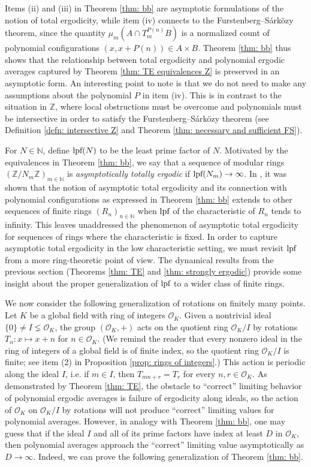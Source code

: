\documentclass{amsart}
\theoremstyle{definition}
\numberwithin{equation}{section}
\newcommand{\N}{\mathbb{N}}
\newcommand{\Z}{\mathbb{Z}}
\newcommand{\mO}{\mathcal{O}}
\newcommand{\lpf}{\normalfont\text{lpf}}
\begin{document}
Items (ii) and (iii) in Theorem \ref{thm: bb} are asymptotic formulations of the notion of total ergodicity, while item (iv) connects to the Furstenberg--S\'{a}rk\"{o}zy theorem, since the quantity $\mu_m(A \cap T_m^{P(n)}B)$ is a normalized count of polynomial configurations $(x, x+P(n)) \in A \times B$.
Theorem \ref{thm: bb} thus shows that the relationship between total ergodicity and polynomial ergodic averages captured by Theorem \ref{thm: TE equivalences Z} is preserved in an asymptotic form.
An interesting point to note is that we do not need to make any assumptions about the polynomial $P$ in item (iv).
This is in contrast to the situation in $\Z$, where local obstructions must be overcome and polynomials must be intersective in order to satisfy the Furstenberg--S\'{a}rk\"{o}zy theorem (see Definition \ref{defn: intersective Z} and Theorem \ref{thm: necessary and sufficient FS}).

For $N \in \N$, define $\lpf(N)$ to be the least prime factor of $N$.
Motivated by the equivalences in Theorem \ref{thm: bb}, we say that a sequence of modular rings $(\Z/N_m\Z)_{m \in \N}$ is \emph{asymptotically totally ergodic} if $\lpf(N_m) \to \infty$.
In \cite{bb2}, it was shown that the notion of asymptotic total ergodicity and its connection with polynomial configurations as expressed in Theorem \ref{thm: bb} extends to other sequences of finite rings $(R_n)_{n \in \N}$ when $\lpf$ of the characteristic of $R_n$ tends to infinity.
This leaves unaddressed the phenomenon of asymptotic total ergodicity for sequences of rings where the characteristic is fixed.
In order to capture asymptotic total ergodicity in the low characteristic setting, we must revisit $\lpf$ from a more ring-theoretic point of view.
The dynamical results from the previous section (Theorems \ref{thm: TE} and \ref{thm: strongly ergodic}) provide some insight about the proper generalization of $\lpf$ to a wider class of finite rings.

We now consider the following generalization of rotations on finitely many points.
Let $K$ be a global field with ring of integers $\mO_K$.
Given a nontrivial ideal $\{0\} \ne I \lneq \mO_K$, the group $(\mO_K,+)$ acts on the quotient ring $\mO_K/I$ by rotations $T_n : x \mapsto x+n$ for $n \in \mO_K$.
(We remind the reader that every nonzero ideal in the ring of integers of a global field is of finite index, so the quotient ring $\mO_K/I$ is finite; see item (2) in Proposition \ref{prop: rings of integers}.)
This action is periodic along the ideal $I$, i.e. if $m \in I$, then $T_{mn+r} = T_r$ for every $n, r \in \mO_K$.
As demonstrated by Theorem \ref{thm: TE}, the obstacle to ``correct'' limiting behavior of polynomial ergodic averages is failure of ergodicity along ideals, so the action of $\mO_K$ on $\mO_K/I$ by rotations will not produce ``correct'' limiting values for polynomial averages.
However, in analogy with Theorem \ref{thm: bb}, one may guess that if the ideal $I$ and all of its prime factors have index at least $D$ in $\mO_K$, then polynomial averages approach the ``correct'' limiting value asymptotically as $D \to \infty$.
Indeed, we can prove the following generalization of Theorem \ref{thm: bb}.
\end{document}
